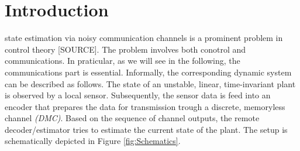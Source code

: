 \documentclass[conference]{IEEEtran}
\newcommand{\sdummy}{{\color{red}[SOURCE]}}
\begin{document}
\section{Introduction}	\label{sec:Introduction}
	 state estimation via noisy communication channels is a prominent problem in control theory \sdummy. 
	The problem involves both conotrol and communications. In praticular, as we will see in the following, the communications part is essential.  
	Informally, the corresponding dynamic system can be described as follows. The state of an unstable, linear, time-invariant plant is observed by a local sensor. 
	Subsequently, the sensor data is feed into an encoder that prepares the data for transmission trough a discrete, memoryless channel \emph{(DMC)}. 
	Based on the sequence of channel outputs, the remote decoder/estimator tries to estimate the current state of the plant. The setup is schematically depicted in Figure \ref{fig:Schematics}.
\end{document}
